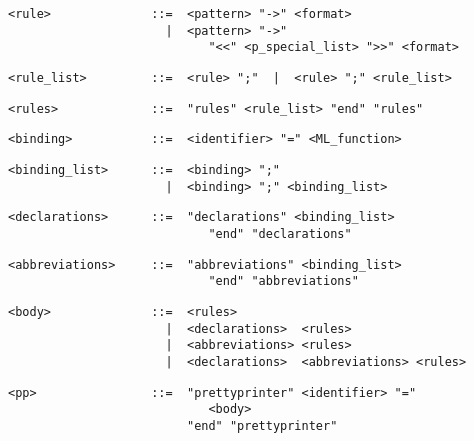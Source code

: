 \begin{small}\begin{verbatim}
<rule>              ::=  <pattern> "->" <format>
                      |  <pattern> "->"
                            "<<" <p_special_list> ">>" <format>
\end{verbatim}\end{small}

\begin{small}\begin{verbatim}
<rule_list>         ::=  <rule> ";"  |  <rule> ";" <rule_list>
\end{verbatim}\end{small}

\begin{small}\begin{verbatim}
<rules>             ::=  "rules" <rule_list> "end" "rules"
\end{verbatim}\end{small}

\begin{small}\begin{verbatim}
<binding>           ::=  <identifier> "=" <ML_function>
\end{verbatim}\end{small}

\begin{small}\begin{verbatim}
<binding_list>      ::=  <binding> ";"
                      |  <binding> ";" <binding_list>
\end{verbatim}\end{small}

\begin{small}\begin{verbatim}
<declarations>      ::=  "declarations" <binding_list>
                            "end" "declarations"
\end{verbatim}\end{small}

\begin{small}\begin{verbatim}
<abbreviations>     ::=  "abbreviations" <binding_list>
                            "end" "abbreviations"
\end{verbatim}\end{small}

\begin{small}\begin{verbatim}
<body>              ::=  <rules>
                      |  <declarations>  <rules>
                      |  <abbreviations> <rules>
                      |  <declarations>  <abbreviations> <rules>
\end{verbatim}\end{small}

\begin{small}\begin{verbatim}
<pp>                ::=  "prettyprinter" <identifier> "="
                            <body>
                         "end" "prettyprinter"
\end{verbatim}\end{small}
